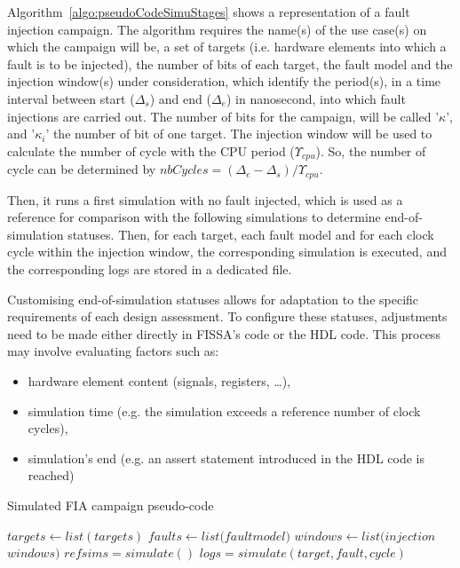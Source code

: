 Algorithm~\ref{algo:pseudoCodeSimuStages} shows a representation of a fault injection campaign. The algorithm requires the name(s) of the use case(s) on which the campaign will be, a set of targets (i.e. hardware elements into which a fault is to be injected), the number of bits of each target, the fault model and the injection window(s) under consideration, which identify the period(s), in a time interval between start ($\Delta_s$) and end ($\Delta_e$) in nanosecond, into which fault injections are carried out.
The number of bits for the campaign, will be called '$\kappa$', and '$\kappa_i$' the number of bit of one target.
The injection window will be used to calculate the number of cycle with the CPU period ($\varUpsilon_{cpu}$). So, the number of cycle can be determined by $nbCycles = (\Delta_e - \Delta_s) / \varUpsilon_{cpu}$.

Then, it runs a first simulation with no fault injected, which is used as a reference for comparison with the following simulations to determine end-of-simulation statuses. 
Then, for each target, each fault model and for each clock cycle within the injection window, the corresponding simulation is executed, and the corresponding logs are stored in a dedicated file.

Customising end-of-simulation statuses allows for adaptation to the specific requirements of each design assessment. To configure these statuses, adjustments need to be made either directly in FISSA's code or the HDL code. This process may involve evaluating factors such as:
\begin{itemize}
    \item hardware element content (signals, registers, \ldots),
    \item simulation time (e.g. the simulation exceeds a reference number of clock cycles),
    \item simulation's end (e.g. an assert statement introduced in the HDL code is reached)
\end{itemize}

\begin{algorithm}
    \caption{Simulated FIA campaign pseudo-code}
    \label{algo:pseudoCodeSimuStages}
    \normalsize
    \begin{algorithmic}[1]
        \Require $targets \leftarrow list(targets)$
        \Require $faults \leftarrow list(fault$\textunderscore$model)$
        \Require $windows \leftarrow list(injection$\textunderscore$windows)$
            \State $ref$\textunderscore$sims = simulate()$
                        \State $logs = simulate(target, fault, cycle)$
                    \EndFor
                \EndFor
            \EndFor
    \end{algorithmic}
\end{algorithm}

